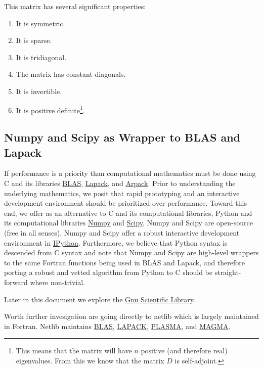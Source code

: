 \documentclass[12pt,]{book}
\providecommand{\tightlist}{%
  \setlength{\itemsep}{0pt}\setlength{\parskip}{0pt}}
\begin{document}
This matrix has several significant properties:

\begin{enumerate}
\def\labelenumi{\arabic{enumi}.}
\tightlist
\item
  It is symmetric.
\item
  It is sparse.
\item
  It is tridiagonal.
\item
  The matrix has constant diagonals.
\item
  It is invertible.
\item
  It is positive
  definite\footnote{This means that the matrix will have $n$ positive (and therefore real) eigenvalues. From this we know that the matrix $D$ is self-adjoint.}.
\end{enumerate}

\subsection{Numpy and Scipy as Wrapper to BLAS and
Lapack}\label{numpy-and-scipy-as-wrapper-to-blas-and-lapack}

If performance is a priority than computational mathematics must be done
using C and its libraries \href{http://www.netlib.org/blas/}{BLAS},
\href{http://www.netlib.org/lapack/}{Lapack}, and
\href{http://www.caam.rice.edu/software/ARPACK/}{Arpack}. Prior to
understanding the underlying mathematics, we posit that rapid
prototyping and an interactive development environment should be
prioritized over performance. Toward this end, we offer as an
alternative to C and its computational libraries, Python and its
computational libraries \href{http://www.numpy.org/}{Numpy} and
\href{http://www.scipy.org/}{Scipy}. Numpy and Scipy are open-source
(free in all senses). Numpy and Scipy offer a robust interactive
development environment in \href{http://ipython.org/}{IPython}.
Furthermore, we believe that Python syntax is descended from C syntax
and note that Numpy and Scipy are high-level wrappers to the same
Fortran functions being used in BLAS and Lapack, and therefore porting a
robust and vetted algorithm from Python to C should be straight-forward
where non-trivial.

Later in this document we explore the
\href{https://www.gnu.org/software/gsl/}{Gnu Scientific Library}.

Worth further invesigation are going directly to netlib which is largely
maintained in Fortran. Netlib maintains
\href{http://www.netlib.org/blas/}{BLAS},
\href{http://www.netlib.org/lapack/}{LAPACK},
\href{http://icl.cs.utk.edu/plasma/}{PLASMA}, and
\href{http://icl.cs.utk.edu/magma/}{MAGMA}.
\end{document}
